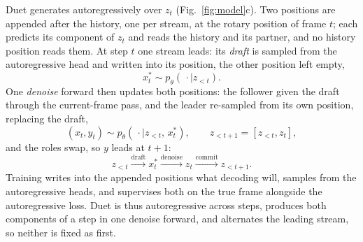 Duet generates autoregressively over $z_t$ (Fig.~\ref{fig:model}c). Two
positions are appended after the history, one per stream, at the rotary
position of frame $t$; each predicts its component of $z_t$ and reads
the history and its partner, and no history position reads them. At
step $t$ one stream leads: its \emph{draft} is sampled from the
autoregressive head and written into its position, the other position
left empty,
\begin{equation}
    x_t^{*} \sim p_\theta(\,\cdot \mid z_{<t}).
    \label{eq:draft}
\end{equation}
One \emph{denoise} forward then updates both positions: the follower
given the draft through the current-frame pass, and the leader
re-sampled from its own position, replacing the draft,
\begin{equation}
    (x_t, y_t) \sim p_\theta(\,\cdot \mid z_{<t},\, x_t^{*}),
    \qquad
    z_{<t+1} = [z_{<t}, z_t],
    \label{eq:denoise}
\end{equation}
and the roles swap, so $y$ leads at $t{+}1$:
\begin{equation}
    z_{<t}
    \xrightarrow{\mathrm{draft}} x_t^{*}
    \xrightarrow{\mathrm{denoise}} z_t
    \xrightarrow{\mathrm{commit}} z_{<t+1}.
    \label{eq:generation_summary}
\end{equation}
Training writes into the appended positions what decoding will, samples
from the autoregressive heads, and supervises both on the true frame
alongside the autoregressive loss. Duet is thus autoregressive across
steps, produces both components of a step in one denoise forward, and
alternates the leading stream, so neither is fixed as first.

